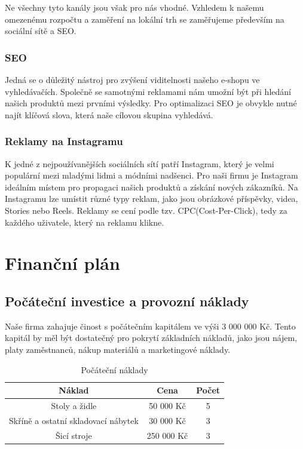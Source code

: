 \documentclass[12pt, a4paper]{article}
\begin{document}
Ne všechny tyto kanály jsou však pro nás vhodné. Vzhledem k našemu omezenému rozpočtu a zaměření na lokální trh se zaměřujeme především na sociální sítě a SEO.

\subsubsection{SEO}

Jedná se o důležitý nástroj pro zvýšení viditelnosti našeho e-shopu ve vyhledávačích.
Společně se samotnými reklamami nám umožní být při hledání našich produktů mezi prvními výsledky.
Pro optimalizaci SEO je obvykle nutné najít klíčová slova, která naše cílovou skupina vyhledává.

\subsubsection{Reklamy na Instagramu}

K jedné z nejpoužívanějších sociálních sítí patří Instagram, který je velmi populární mezi mladými lidmi a módními nadšenci.
Pro naši firmu je Instagram ideálním místem pro propagaci našich produktů a získání nových zákazníků.
Na Instagramu lze umístit různé typy reklam, jako jsou obrázkové příspěvky, videa, Stories nebo Reels.
Reklamy se cení podle tzv. CPC(Cost-Per-Click), tedy za každého uživatele, který na reklamu klikne.

\section{Finanční plán}

\subsection{Počáteční investice a provozní náklady}

Naše firma zahajuje činost s počátečním kapitálem ve výši 3 000 000 Kč.
Tento kapitál by měl být dostatečný pro pokrytí základních nákladů,
jako jsou nájem, platy zaměstnanců, nákup materiálů a marketingové náklady.

\begin{table}[h]
  \centering
  \begin{tabular}{ | c | c | c | }
    \hline
    \textbf{Náklad} & \textbf{Cena} & \textbf{Počet} \\
    \hline \hline
    Stoly a židle & 50 000 Kč & 5 \\
    \hline
    Skříně a ostatní skladovací nábytek & 30 000 Kč & 3 \\
    \hline
    Šicí stroje & 250 000 Kč & 3 \\
    \hline
  \end{tabular}
  \caption{Počáteční náklady}
\end{table}
\end{document}
